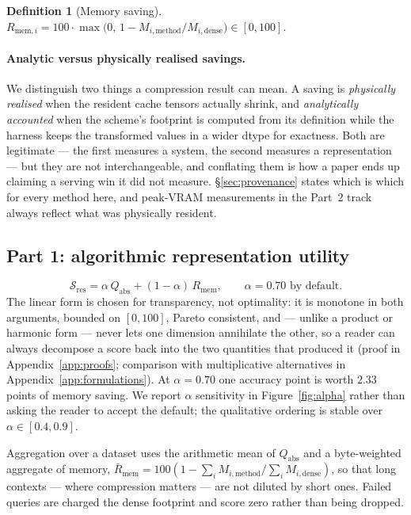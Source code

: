 \documentclass{article}
\theoremstyle{definition}
\newtheorem{definition}{Definition}
\newcommand{\Sres}{\mathcal{S}_{\text{res}}}
\begin{document}
\begin{definition}[Memory saving]
$R_{\text{mem},i} = 100 \cdot \max\!\big(0,\, 1 - M_{i,\text{method}} / M_{i,\text{dense}}\big) \in [0,100]$.
\end{definition}

\paragraph{Analytic versus physically realised savings.} We distinguish two things a compression result can mean. A saving is \emph{physically realised} when the resident cache tensors actually shrink, and \emph{analytically accounted} when the scheme's footprint is computed from its definition while the harness keeps the transformed values in a wider dtype for exactness. Both are legitimate --- the first measures a system, the second measures a representation --- but they are not interchangeable, and conflating them is how a paper ends up claiming a serving win it did not measure. \S\ref{sec:provenance} states which is which for every method here, and peak-VRAM measurements in the Part~2 track always reflect what was physically resident.

\subsection{Part 1: algorithmic representation utility}

\begin{equation}
\label{eq:sres}
\Sres = \alpha \, Q_{\text{abs}} + (1 - \alpha)\, R_{\text{mem}}, \qquad \alpha = 0.70 \text{ by default}.
\end{equation}
The linear form is chosen for transparency, not optimality: it is monotone in both arguments, bounded on $[0,100]$, Pareto consistent, and --- unlike a product or harmonic form --- never lets one dimension annihilate the other, so a reader can always decompose a score back into the two quantities that produced it (proof in Appendix~\ref{app:proofs}; comparison with multiplicative alternatives in Appendix~\ref{app:formulations}). At $\alpha = 0.70$ one accuracy point is worth $2.33$ points of memory saving. We report $\alpha$ sensitivity in Figure~\ref{fig:alpha} rather than asking the reader to accept the default; the qualitative ordering is stable over $\alpha \in [0.4, 0.9]$.

Aggregation over a dataset uses the arithmetic mean of $Q_{\text{abs}}$ and a byte-weighted aggregate of memory, $\bar{R}_{\text{mem}} = 100(1 - \sum_i M_{i,\text{method}} / \sum_i M_{i,\text{dense}})$, so that long contexts --- where compression matters --- are not diluted by short ones. Failed queries are charged the dense footprint and score zero rather than being dropped.
\end{document}

